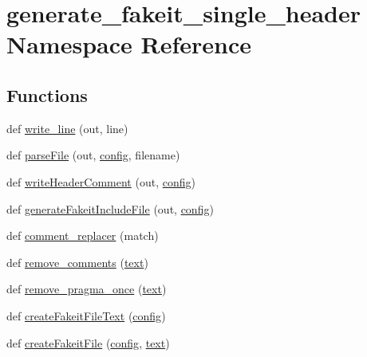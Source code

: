 \hypertarget{namespacegenerate__fakeit__single__header}{}\section{generate\+\_\+fakeit\+\_\+single\+\_\+header Namespace Reference}
\label{namespacegenerate__fakeit__single__header}
\subsection*{Functions}
\begin{DoxyCompactItemize}
\item 
def \mbox{\hyperlink{namespacegenerate__fakeit__single__header_a9bcd50ba9c1f6d846dab8186ebf61221}{write\+\_\+line}} (out, line)
\item 
def \mbox{\hyperlink{namespacegenerate__fakeit__single__header_a783f58bb10a5123efa33f4c60bfc323b}{parse\+File}} (out, \mbox{\hyperlink{namespacegenerate__fakeit__single__header_a8bc6420681fec1a1f97812159ea296c2}{config}}, filename)
\item 
def \mbox{\hyperlink{namespacegenerate__fakeit__single__header_ae679847c4f8cfaa4e40a795dea1c6f80}{write\+Header\+Comment}} (out, \mbox{\hyperlink{namespacegenerate__fakeit__single__header_a8bc6420681fec1a1f97812159ea296c2}{config}})
\item 
def \mbox{\hyperlink{namespacegenerate__fakeit__single__header_a1679add8f71bf7ee50c5aa9a2a190196}{generate\+Fakeit\+Include\+File}} (out, \mbox{\hyperlink{namespacegenerate__fakeit__single__header_a8bc6420681fec1a1f97812159ea296c2}{config}})
\item 
def \mbox{\hyperlink{namespacegenerate__fakeit__single__header_a95906064be1f87939d4725d66dfbdde9}{comment\+\_\+replacer}} (match)
\item 
def \mbox{\hyperlink{namespacegenerate__fakeit__single__header_a0186da228170e7785db504ca119dc370}{remove\+\_\+comments}} (\mbox{\hyperlink{namespacegenerate__fakeit__single__header_afac367357ef002b78b6d1f310d568c48}{text}})
\item 
def \mbox{\hyperlink{namespacegenerate__fakeit__single__header_a0315cb1aed7678bf0a9040b4414aee91}{remove\+\_\+pragma\+\_\+once}} (\mbox{\hyperlink{namespacegenerate__fakeit__single__header_afac367357ef002b78b6d1f310d568c48}{text}})
\item 
def \mbox{\hyperlink{namespacegenerate__fakeit__single__header_a706bc4d83a52c73779e880efbf2db60c}{create\+Fakeit\+File\+Text}} (\mbox{\hyperlink{namespacegenerate__fakeit__single__header_a8bc6420681fec1a1f97812159ea296c2}{config}})
\item 
def \mbox{\hyperlink{namespacegenerate__fakeit__single__header_a2ac20256d7e215ef5bb63d7c4926e8e2}{create\+Fakeit\+File}} (\mbox{\hyperlink{namespacegenerate__fakeit__single__header_a8bc6420681fec1a1f97812159ea296c2}{config}}, \mbox{\hyperlink{namespacegenerate__fakeit__single__header_afac367357ef002b78b6d1f310d568c48}{text}})
\end{DoxyCompactItemize}
